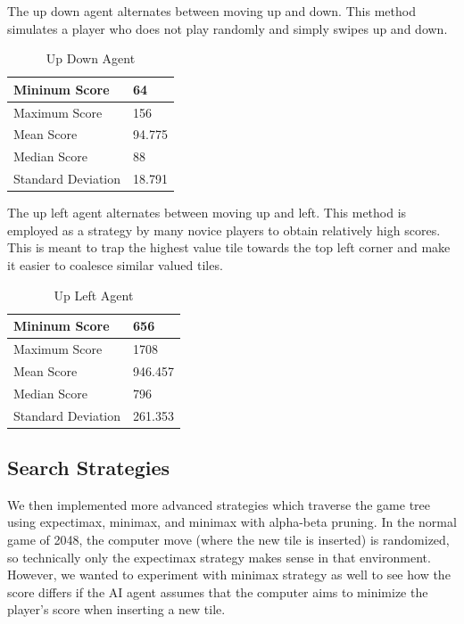 \documentclass[9pt,twocolumn]{article}
\begin{document}
The up down agent alternates between moving up and down. This method simulates a player who does not play randomly and simply swipes up and down.

\begin{table}[!htbp]

\centering

\begin{tabular}{|l|l|}
\hline
Mininum Score      & 64 \\ \hline
Maximum Score      & 156 \\ \hline
Mean Score         & 94.775 \\ \hline
Median Score       & 88 \\ \hline
Standard Deviation & 18.791 \\ \hline
\end{tabular}

\caption{Up Down Agent}

\end{table}

The up left agent alternates between moving up and left. This method is employed as a strategy by many novice players to obtain relatively high scores. This is meant to trap the highest value tile towards the top left corner and make it easier to coalesce similar valued tiles.

\begin{table}[!htbp]

\centering

\begin{tabular}{|l|l|}
\hline
Mininum Score      & 656 \\ \hline
Maximum Score      & 1708 \\ \hline
Mean Score         & 946.457 \\ \hline
Median Score       & 796 \\ \hline
Standard Deviation & 261.353 \\ \hline
\end{tabular}

\caption{Up Left Agent}

\end{table}

\subsection{Search Strategies}

We then implemented more advanced strategies which traverse the game tree using expectimax, minimax, and minimax with alpha-beta pruning. In the normal game of 2048, the computer move (where the new tile is inserted) is randomized, so technically only the expectimax strategy makes sense in that environment. However, we wanted to experiment with minimax strategy as well to see how the score differs if the AI agent assumes that the computer aims to minimize the player’s score when inserting a new tile.
\end{document}
